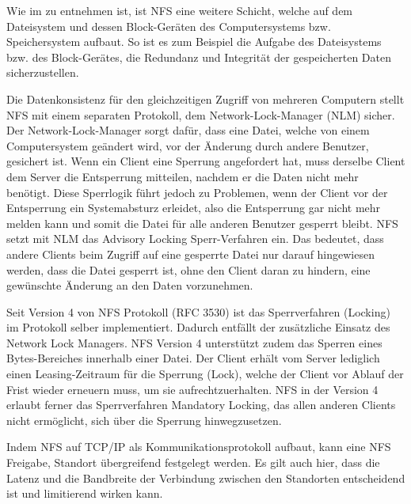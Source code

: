 Wie im  zu entnehmen ist, ist NFS eine weitere Schicht, welche auf dem Dateisystem und dessen Block-Geräten des Computersystems bzw. Speichersystem aufbaut. So ist es zum Beispiel die Aufgabe des Dateisystems bzw. des Block-Gerätes, die Redundanz und Integrität der gespeicherten Daten sicherzustellen. 

Die Datenkonsistenz für den gleichzeitigen Zugriff von mehreren Computern stellt NFS mit einem separaten Protokoll, dem Network-Lock-Manager (NLM) sicher. Der Network-Lock-Manager sorgt dafür, dass eine Datei, welche von einem Computersystem geändert wird, vor der Änderung durch andere Benutzer, gesichert ist. Wenn ein Client eine Sperrung angefordert hat, muss derselbe Client dem Server die Entsperrung mitteilen, nachdem er die Daten nicht mehr benötigt. Diese Sperrlogik führt jedoch zu Problemen, wenn der Client vor der Entsperrung ein Systemabsturz erleidet, also die Entsperrung gar nicht mehr melden kann und somit die Datei für alle anderen Benutzer gesperrt bleibt.
NFS setzt mit NLM das Advisory Locking Sperr-Verfahren ein. Das bedeutet, dass andere Clients beim Zugriff auf eine gesperrte Datei nur darauf hingewiesen werden, dass die Datei gesperrt ist, ohne den Client daran zu hindern, eine gewünschte Änderung an den Daten vorzunehmen.\cite{Stern2001}

Seit Version 4 von NFS Protokoll (\gls{RFC} 3530) ist das Sperrverfahren (Locking) im Protokoll selber implementiert. Dadurch entfällt der zusätzliche Einsatz des Network Lock Managers. NFS Version 4 unterstützt zudem das Sperren eines Bytes-Bereiches innerhalb einer Datei. Der Client erhält vom Server lediglich einen Leasing-Zeitraum für die Sperrung (Lock), welche der Client vor Ablauf der Frist wieder erneuern muss, um sie aufrechtzuerhalten. NFS in der Version 4 erlaubt ferner das Sperrverfahren Mandatory Locking, das allen anderen Clients nicht ermöglicht, sich über die Sperrung hinwegzusetzen.\cite{Callaghan2003}

Indem NFS auf TCP/IP als Kommunikationsprotokoll aufbaut, kann eine NFS Freigabe, Standort übergreifend festgelegt werden. Es gilt auch hier, dass die Latenz und die Bandbreite der Verbindung zwischen den Standorten entscheidend ist und limitierend wirken kann.

